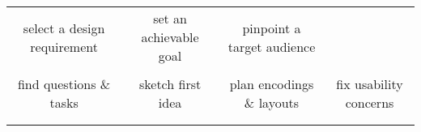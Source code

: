 {\begin{longtable}[]{cccc}
\begin{minipage}[t]{0.21\columnwidth}
select a design requirement\strut
\end{minipage} & \begin{minipage}[t]{0.21\columnwidth}\raggedright\strut
set an achievable goal\strut
\end{minipage} & \begin{minipage}[t]{0.21\columnwidth}\raggedright\strut
pinpoint a target audience\strut
\end{minipage}\tabularnewline
\begin{minipage}[t]{0.21\columnwidth}\raggedright\strut
\strut
\end{minipage} & \begin{minipage}[t]{0.21\columnwidth}\raggedright\strut
\strut
\end{minipage} & \begin{minipage}[t]{0.21\columnwidth}\raggedright\strut
\strut
\end{minipage} & \begin{minipage}[t]{0.21\columnwidth}\raggedright\strut
\strut
\end{minipage}\tabularnewline
\begin{minipage}[t]{0.21\columnwidth}\raggedright\strut
find questions \& tasks\strut
\end{minipage} & \begin{minipage}[t]{0.21\columnwidth}\raggedright\strut
sketch first idea\strut
\end{minipage} & \begin{minipage}[t]{0.21\columnwidth}\raggedright\strut
plan encodings \& layouts\strut
\end{minipage} & \begin{minipage}[t]{0.21\columnwidth}\raggedright\strut
fix usability concerns\strut
\end{minipage}\tabularnewline
\begin{minipage}[t]{0.21\columnwidth}\raggedright\strut
\strut
\end{minipage} & \begin{minipage}[t]{0.21\columnwidth}\raggedright\strut
\strut
\end{minipage} & \begin{minipage}[t]{0.21\columnwidth}\raggedright\strut
\strut
\end{minipage} & \begin{minipage}[t]{0.21\columnwidth}\raggedright\strut
\strut
\end{minipage}\tabularnewline
\begin{minipage}[t]{0.21\columnwidth}\raggedright\strut

\end{minipage}
\end{longtable}}
